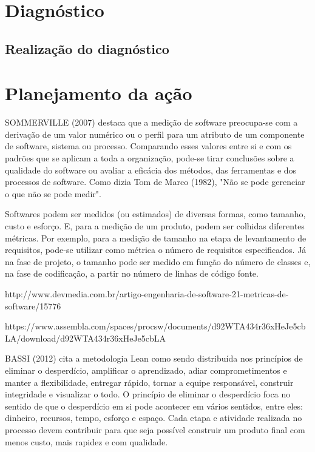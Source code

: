 \section{Diagnóstico}




	\subsection{Realização do diagnóstico}



	\section{Planejamento da ação}

		SOMMERVILLE (2007) destaca que a medição de software preocupa-se com a derivação de um valor numérico ou o perfil para um atributo de um componente de software, sistema ou processo. Comparando esses valores entre si e com os padrões que se aplicam a toda a organização, pode-se tirar conclusões sobre a qualidade do software ou avaliar a eficácia dos métodos, das ferramentas e dos processos de software. Como dizia Tom de Marco (1982), "Não se pode gerenciar o que não se pode medir".

		Softwares podem ser medidos (ou estimados) de diversas formas, como tamanho, custo e esforço. E, para a medição de um produto, podem ser colhidas diferentes métricas. Por exemplo, para a medição de tamanho na etapa de levantamento de requisitos, pode-se utilizar como métrica o número de requisitos especificados. Já na fase de projeto, o tamanho pode ser medido em função do número de classes e, na fase de codificação, a partir no número de linhas de código fonte.

		http://www.devmedia.com.br/artigo-engenharia-de-software-21-metricas-de-software/15776

		https://www.assembla.com/spaces/procsw/documents/d92WTA434r36xHeJe5cbLA/download/d92WTA434r36xHeJe5cbLA

		BASSI (2012) cita a metodologia Lean como sendo distribuída nos princípios de eliminar o desperdício, amplificar o aprendizado, adiar comprometimentos e manter a flexibilidade, entregar rápido, tornar a equipe responsável, construir integridade e visualizar o todo. O princípio de eliminar o desperdício foca no sentido de que o desperdício em si pode acontecer em vários sentidos, entre eles: dinheiro, recursos, tempo, esforço e espaço. Cada etapa e atividade realizada no processo devem contribuir para que seja possível construir um produto final com menos custo, mais rapidez e com qualidade.

